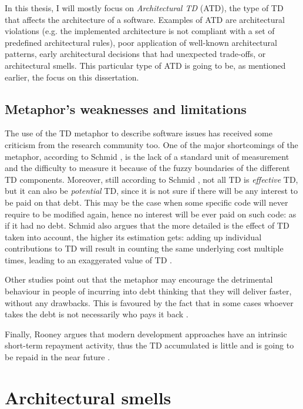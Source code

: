 In this thesis, I will mostly focus on \emph{Architectural TD} (ATD), the type of TD that affects the architecture of a software.
Examples of ATD are architectural violations (e.g. the implemented architecture is not compliant with a set of predefined architectural rules), poor application of well-known architectural patterns, early architectural decisions that had unexpected trade-offs, or architectural smells.
This particular type of ATD is going to be, as mentioned earlier, the focus on this dissertation.

\subsection{Metaphor's weaknesses and limitations}
The use of the TD metaphor to describe software issues has received some criticism from the research community too.
One of the major shortcomings of the metaphor, according to Schmid \cite{Schmid2013}, is the lack of a standard unit of measurement and the difficulty to measure it because of the fuzzy boundaries of the different TD components.
Moreover, still according to Schmid \cite{Schmid2013}, not all TD is \textit{effective} TD, but it can also be \textit{potential} TD, since it is not sure if there will be any interest to be paid on that debt.
This may be the case when some specific code will never require to be modified again, hence no interest will be ever paid on such code: as if it had no debt.
Schmid also argues that the more detailed is the effect of TD taken into account, the higher its estimation gets: adding up individual contributions to TD will result in counting the same underlying cost multiple times, leading to an exaggerated value of TD \cite{Schmid2013}.

Other studies point out that the metaphor may encourage the detrimental behaviour in people of incurring into debt thinking that they will deliver faster, without any drawbacks. This is favoured by the fact that in some cases whoever takes the debt is not necessarily who pays it back \cite{Allman2012}.

Finally, Rooney argues that modern development approaches have an intrinsic short-term repayment activity, thus the TD accumulated is little and is going to be repaid in the near future \cite{Rooney2010}.

\section{Architectural smells}
